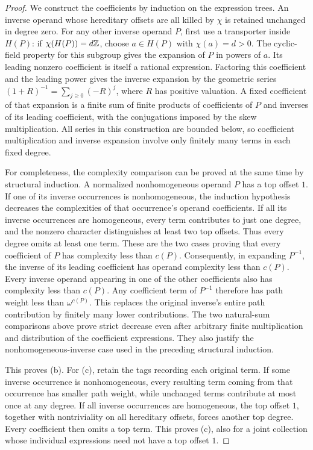 \begin{proof}
We construct the coefficients by induction on the expression trees.
An inverse operand whose hereditary offsets are all killed by
\(\chi\) is retained unchanged in degree zero. For any other inverse
operand \(P\), first use a transporter inside \(H(P)\): if
\(\chi(H(P))=d\mathbb Z\), choose \(a\in H(P)\) with \(\chi(a)=d>0\).
The cyclic-field property for this subgroup gives the expansion of
\(P\) in powers of \(a\). Its leading nonzero coefficient is itself
a rational expression. Factoring this coefficient and the leading
power gives the inverse expansion by the geometric series
\((1+R)^{-1}=\sum_{j\ge0}(-R)^j\), where \(R\) has positive
valuation. A fixed coefficient of that expansion is a finite sum of
finite products of coefficients of \(P\) and inverses of its leading
coefficient, with the conjugations imposed by the skew multiplication.
All series in this construction are bounded below, so coefficient
multiplication and inverse expansion involve only finitely many terms
in each fixed degree.

For completeness, the complexity comparison can be proved at the same
time by structural induction. A normalized nonhomogeneous operand
\(P\) has a top offset \(1\). If one of its inverse occurrences is
nonhomogeneous, the induction hypothesis decreases the complexities of
that occurrence's operand coefficients. If all its inverse occurrences
are homogeneous, every term contributes to just one degree, and the
nonzero character distinguishes at least two top offsets. Thus every
degree omits at least one term. These are the two cases proving that
every coefficient of \(P\) has complexity less than \(c(P)\).
Consequently, in expanding \(P^{-1}\), the inverse of its leading
coefficient has operand complexity less than \(c(P)\). Every inverse
operand appearing in one of the other coefficients also has complexity
less than \(c(P)\). Any coefficient term of \(P^{-1}\) therefore has
path weight less than \(\omega^{c(P)}\). This replaces the original
inverse's entire path contribution by finitely many lower contributions.
The two natural-sum comparisons above prove strict decrease even after
arbitrary finite multiplication and distribution of the coefficient
expressions. They also justify the nonhomogeneous-inverse case used
in the preceding structural induction.

This proves (b). For (c), retain the tags recording each original term.
If some inverse occurrence is nonhomogeneous, every resulting term
coming from that occurrence has smaller path weight, while unchanged
terms contribute at most once at any degree. If all inverse occurrences
are homogeneous, the top offset \(1\), together with nontriviality on
all hereditary offsets, forces another top degree. Every coefficient
then omits a top term. This proves (c), also for a joint collection
whose individual expressions need not have a top offset \(1\).


\end{proof}
